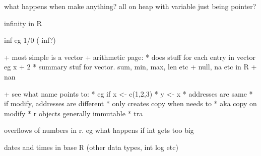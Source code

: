 what happens when make anything? all on heap with variable just being pointer?


infinity in R


inf eg 1/0 (-inf?)

+ most simple is a vector
+ arithmetic page:
  * does stuff for each entry in vector eg x + 2
  * summary stuf for vector. sum, min, max, len etc
+ null, na etc in R
+ nan


+ see what name points to:
  * eg if x <- c(1,2,3)
  * y <- x
  * addresses are same
  * if modify, addresses are different
  * only creates copy when needs to
  * aka copy on modify
  * r objects generally immutable
  * tra


overflows of numbers in r. eg what happens if int gets too big

dates and times in base R (other data types, int log etc)


